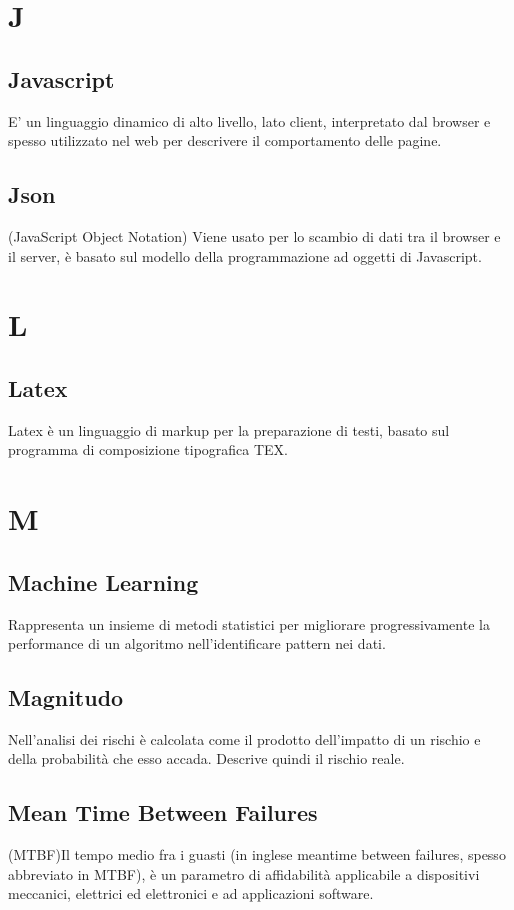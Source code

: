 \section{J}
    \subsection*{Javascript}
E’ un linguaggio dinamico di alto livello, lato client, interpretato dal browser e spesso utilizzato nel web per descrivere il comportamento delle pagine.
    \subsection*{Json}
(JavaScript Object Notation) Viene usato per lo scambio di dati tra il browser e il server, è basato sul modello della programmazione ad oggetti di Javascript.
\newpage

\section{L}
    \subsection*{Latex}
Latex è un linguaggio di markup per la preparazione di testi, basato sul programma di composizione tipografica TEX.
\newpage

\section{M}
    \subsection*{Machine Learning}
Rappresenta un insieme di metodi statistici per migliorare progressivamente la performance di un algoritmo nell’identificare pattern nei dati.
    \subsection*{Magnitudo}
Nell’analisi dei rischi è calcolata come il prodotto dell’impatto di un rischio e della probabilità che esso accada. Descrive quindi il rischio reale.
    \subsection*{Mean Time Between Failures}
(MTBF)Il tempo medio fra i guasti (in inglese meantime between failures, spesso abbreviato in MTBF), è un parametro di affidabilità applicabile a dispositivi meccanici, elettrici ed elettronici e ad applicazioni software.
